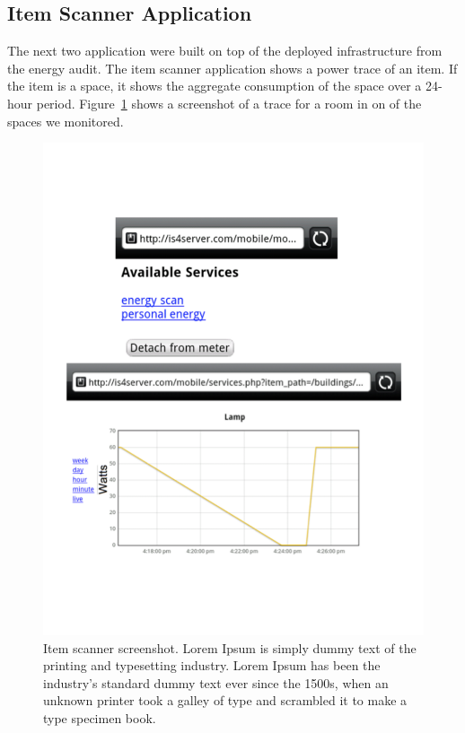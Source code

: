 \subsection{Item Scanner Application}
The next two application were built on top of the deployed infrastructure from the energy audit.
The item scanner application shows a power trace of an item.  If the item is a space, it shows
the aggregate consumption of the space over a 24-hour period.  Figure~\ref{fig:itemscanscreen}
shows a screenshot of a trace for a room in on of the spaces we monitored.

\begin{figure}[htb!]
\begin{center}
\includegraphics[scale=0.39]{figs/menuenergyscan}
\caption{Item scanner screenshot. Lorem Ipsum is simply dummy text of the printing and typesetting industry. Lorem Ipsum has 
been the industry's standard dummy text ever since the 1500s, when an unknown printer took a galley of 
type and scrambled it to make a type specimen book.  }
\label{fig:itemscanscreen}
\end{center}
\end{figure}

